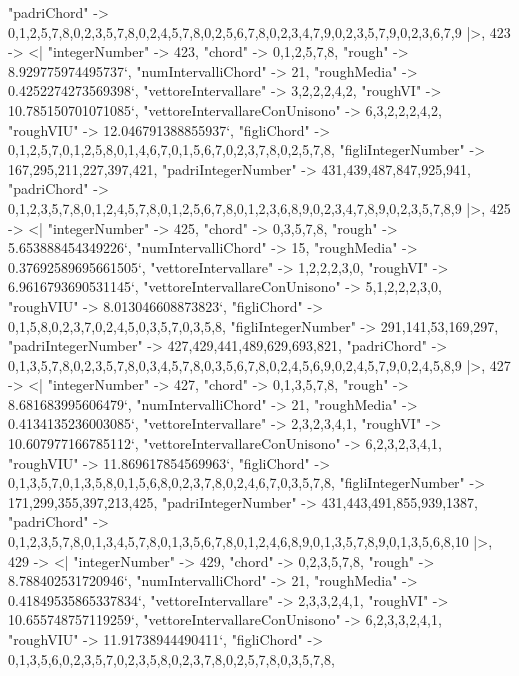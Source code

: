 \documentclass[
]{article}
\begin{document}
\begin{DatasetVerbatim}
    "padriChord" -> {{0,1,2,5,7,8},{0,2,3,5,7,8},{0,2,4,5,7,8},{0,2,5,6,7,8},{0,2,3,4,7,9},{0,2,3,5,7,9},{0,2,3,6,7,9}}
  |>,
  423 -> <|
    "integerNumber" -> 423,
    "chord" -> {0,1,2,5,7,8},
    "rough" -> 8.929775974495737`,
    "numIntervalliChord" -> 21,
    "roughMedia" -> 0.4252274273569398`,
    "vettoreIntervallare" -> {3,2,2,2,4,2},
    "roughVI" -> 10.785150701071085`,
    "vettoreIntervallareConUnisono" -> {6,3,2,2,2,4,2},
    "roughVIU" -> 12.046791388855937`,
    "figliChord" -> {{0,1,2,5,7},{0,1,2,5,8},{0,1,4,6,7},{0,1,5,6,7},{0,2,3,7,8},{0,2,5,7,8}},
    "figliIntegerNumber" -> {167,295,211,227,397,421},
    "padriIntegerNumber" -> {431,439,487,847,925,941},
    "padriChord" -> {{0,1,2,3,5,7,8},{0,1,2,4,5,7,8},{0,1,2,5,6,7,8},{0,1,2,3,6,8,9},{0,2,3,4,7,8,9},{0,2,3,5,7,8,9}}
  |>,
  425 -> <|
    "integerNumber" -> 425,
    "chord" -> {0,3,5,7,8},
    "rough" -> 5.653888454349226`,
    "numIntervalliChord" -> 15,
    "roughMedia" -> 0.37692589695661505`,
    "vettoreIntervallare" -> {1,2,2,2,3,0},
    "roughVI" -> 6.9616793690531145`,
    "vettoreIntervallareConUnisono" -> {5,1,2,2,2,3,0},
    "roughVIU" -> 8.013046608873823`,
    "figliChord" -> {{0,1,5,8},{0,2,3,7},{0,2,4,5},{0,3,5,7},{0,3,5,8}},
    "figliIntegerNumber" -> {291,141,53,169,297},
    "padriIntegerNumber" -> {427,429,441,489,629,693,821},
    "padriChord" -> {{0,1,3,5,7,8},{0,2,3,5,7,8},{0,3,4,5,7,8},{0,3,5,6,7,8},{0,2,4,5,6,9},{0,2,4,5,7,9},{0,2,4,5,8,9}}
  |>,
  427 -> <|
    "integerNumber" -> 427,
    "chord" -> {0,1,3,5,7,8},
    "rough" -> 8.681683995606479`,
    "numIntervalliChord" -> 21,
    "roughMedia" -> 0.4134135236003085`,
    "vettoreIntervallare" -> {2,3,2,3,4,1},
    "roughVI" -> 10.607977166785112`,
    "vettoreIntervallareConUnisono" -> {6,2,3,2,3,4,1},
    "roughVIU" -> 11.869617854569963`,
    "figliChord" -> {{0,1,3,5,7},{0,1,3,5,8},{0,1,5,6,8},{0,2,3,7,8},{0,2,4,6,7},{0,3,5,7,8}},
    "figliIntegerNumber" -> {171,299,355,397,213,425},
    "padriIntegerNumber" -> {431,443,491,855,939,1387},
    "padriChord" -> {{0,1,2,3,5,7,8},{0,1,3,4,5,7,8},{0,1,3,5,6,7,8},{0,1,2,4,6,8,9},{0,1,3,5,7,8,9},{0,1,3,5,6,8,10}}
  |>,
  429 -> <|
    "integerNumber" -> 429,
    "chord" -> {0,2,3,5,7,8},
    "rough" -> 8.788402531720946`,
    "numIntervalliChord" -> 21,
    "roughMedia" -> 0.41849535865337834`,
    "vettoreIntervallare" -> {2,3,3,2,4,1},
    "roughVI" -> 10.655748757119259`,
    "vettoreIntervallareConUnisono" -> {6,2,3,3,2,4,1},
    "roughVIU" -> 11.91738944490411`,
    "figliChord" -> {{0,1,3,5,6},{0,2,3,5,7},{0,2,3,5,8},{0,2,3,7,8},{0,2,5,7,8},{0,3,5,7,8}},

\end{DatasetVerbatim}
\end{document}
